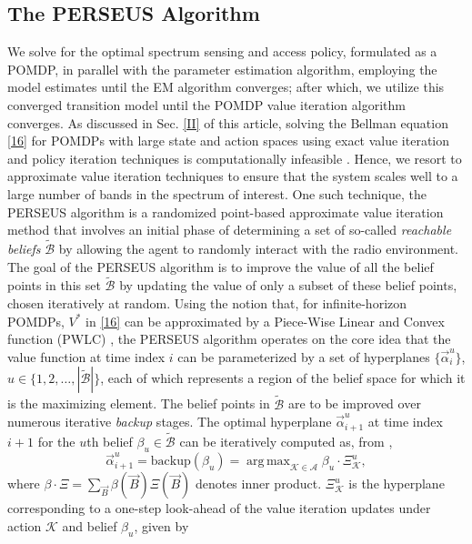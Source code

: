 \documentclass[10pt,twocolumn]{IEEEtran}
\DeclareMathOperator*{\argmax}{arg\,max}
\begin{document}
\subsection{The PERSEUS Algorithm}
We solve for the optimal spectrum sensing and access policy, formulated as a POMDP, in parallel with the parameter estimation algorithm, employing the model estimates until the EM algorithm converges; after which, we utilize this converged transition model until the POMDP value iteration algorithm converges. As discussed in Sec. \ref{II} of this article, solving the Bellman equation \eqref{16} for POMDPs with large state and action spaces using exact value iteration and policy iteration techniques is computationally infeasible \cite{DBLP:journals/corr/abs-1109-2145}. Hence, we resort to approximate value iteration techniques to ensure that the system scales well to a large number of bands in the spectrum of interest. One such technique, the PERSEUS algorithm \cite{DBLP:journals/corr/abs-1109-2145} is a randomized point-based approximate value iteration method that involves an initial phase of determining a set of so-called \emph{reachable beliefs} $\tilde{\mathcal{B}}$ by allowing the agent to randomly interact with the radio environment. The goal of the PERSEUS algorithm is to improve the value of all the belief points in this set $\tilde{\mathcal{B}}$ by updating the value of only a subset of these belief points, chosen iteratively at random. Using the notion that, for infinite-horizon POMDPs, $V^*$ in \eqref{16} can be approximated by a Piece-Wise Linear and Convex function (PWLC) \cite{DBLP:journals/corr/abs-1109-2145}, the PERSEUS algorithm operates on the core idea that the value function at time index $i$ can be parameterized by a set of hyperplanes $\{\vec{\alpha}_i^{u}\}$, $u {\in} \{1,2,\dots,|\tilde{\mathcal{B}}|\}$, each of which represents a region of the belief space for which it is the maximizing element. The belief points in $\tilde{\mathcal{B}}$ are to be improved over numerous iterative \emph{backup} stages. The optimal hyperplane $\vec{\alpha}_{i+1}^{u}$ at time index $i{+}1$ for the $u$th belief $\beta_{u} \in \tilde{\mathcal{B}}$ can be iteratively computed as, from \cite{DBLP:journals/corr/abs-1109-2145},
\begin{equation}\label{20}
    \vec{\alpha}_{i+1}^{u} = \text{backup}(\beta_{u}){=}\argmax_{\mathcal{K} \in \mathcal{A}} \beta_u \cdot \Xi_{\mathcal{K}}^{u},
\end{equation}
where $\beta\cdot\Xi=\sum_{\vec{B}}\beta(\vec{B})\Xi(\vec{B})$ denotes inner product. $\Xi_{\mathcal{K}}^{u}$ is the hyperplane corresponding to a one-step look-ahead of the value iteration updates under action $\mathcal K$ and belief $\beta_u$, given by
\end{document}
